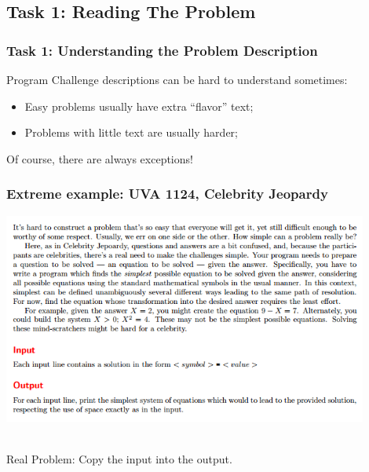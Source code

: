 \documentclass{beamer}
\begin{document}
\subsection{Task 1: Reading The Problem}
\begin{frame}
  \frametitle{Task 1: Understanding the Problem Description}

  Program Challenge descriptions can be hard to understand sometimes:

  \bigskip

  \begin{itemize}
    \item Easy problems usually have extra ``flavor'' text;
    \item Problems with little text are usually harder;
  \end{itemize}

  \bigskip

  Of course, \alert{there are always exceptions!}
\end{frame}

\begin{frame}
  \frametitle{Extreme example: UVA 1124, Celebrity Jeopardy}
  \includegraphics[width=0.9\textwidth]{../img/celebrityjeopardy}

  \hrulefill\\
  \alert{Real Problem:}
  Copy the input into the output.
\end{frame}
\end{document}
